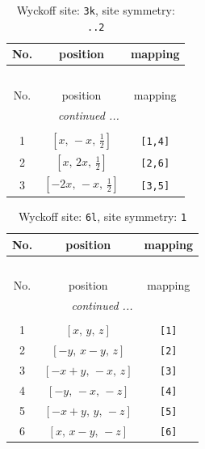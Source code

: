 \documentclass[fleqn,8pt]{jsarticle}
\begin{document}
\begin{longtable}{ccc}
\caption{Wyckoff site: {\tt 3k}, site symmetry: {\tt ..2}}
 \\
 \hline \hline
No. & position & mapping \\ \hline \endfirsthead

\multicolumn{2}{l}{\tablename\ \thetable{}} \\
 \hline \hline
No. & position & mapping \\ \hline \endhead

 \hline \hline
\multicolumn{2}{r}{\footnotesize\it continued ...} \\ \endfoot

 \hline \hline
\multicolumn{2}{r}{} \\ \endlastfoot

1 & $\left[ x,\, - x,\, \frac{1}{2} \right]$ & {\tt [1,4]} \\ \hline
2 & $\left[ x,\, 2 x,\, \frac{1}{2} \right]$ & {\tt [2,6]} \\ \hline
3 & $\left[ - 2 x,\, - x,\, \frac{1}{2} \right]$ & {\tt [3,5]} \\
\end{longtable}
\renewcommand{\arraystretch}{1.2}
\begin{longtable}{ccc}
\caption{Wyckoff site: {\tt 6l}, site symmetry: {\tt 1}}
 \\
 \hline \hline
No. & position & mapping \\ \hline \endfirsthead

\multicolumn{2}{l}{\tablename\ \thetable{}} \\
 \hline \hline
No. & position & mapping \\ \hline \endhead

 \hline \hline
\multicolumn{2}{r}{\footnotesize\it continued ...} \\ \endfoot

 \hline \hline
\multicolumn{2}{r}{} \\ \endlastfoot

1 & $\left[ x,\, y,\, z \right]$ & {\tt [1]} \\ \hline
2 & $\left[ - y,\, x - y,\, z \right]$ & {\tt [2]} \\ \hline
3 & $\left[ - x + y,\, - x,\, z \right]$ & {\tt [3]} \\ \hline
4 & $\left[ - y,\, - x,\, - z \right]$ & {\tt [4]} \\ \hline
5 & $\left[ - x + y,\, y,\, - z \right]$ & {\tt [5]} \\ \hline
6 & $\left[ x,\, x - y,\, - z \right]$ & {\tt [6]} \\
\end{longtable}
\end{document}

